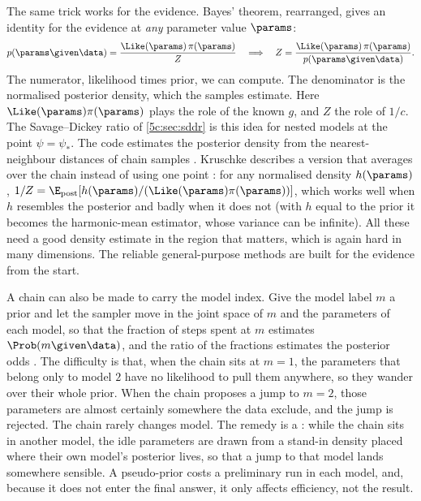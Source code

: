 The same trick works for the evidence. Bayes' theorem, rearranged, gives an identity
for the evidence at \emph{any} parameter value $\params$:
\begin{align}
  p(\params\given\data)=\frac{\Like(\params)\,\pi(\params)}{Z}
  \quad\Longrightarrow\quad
  Z=\frac{\Like(\params)\,\pi(\params)}{p(\params\given\data)} .
  \label{5c:eq:candidate}
\end{align}
The numerator, likelihood times prior, we can compute. The denominator is the
normalised posterior density, which the samples estimate. Here $\Like(\params)\pi(\params)$
plays the role of the known $g$, and $Z$ the role of $1/c$. The Savage--Dickey ratio of
\cref{5c:sec:sddr} is this idea for
nested models at the point $\psi=\psi_*$. The  code estimates the
posterior density from the nearest-neighbour distances of chain samples
. Kruschke describes a version that averages over the chain
instead of using one point : for any normalised density
$h(\params)$, $1/Z=\E_{\rm post}[h(\params)/(\Like(\params)\pi(\params))]$, which works
well when $h$ resembles the posterior and badly when it does not (with $h$ equal to the
prior it becomes the harmonic-mean estimator, whose variance can be infinite). All
these need a good density estimate in the region that matters, which is again hard in
many dimensions. The reliable general-purpose methods are built for the evidence from
the start.

A chain can also be made to carry the model index. Give the model label $m$ a prior and
let the sampler move in the joint space of $m$ and the parameters of each model, so that
the fraction of steps spent at $m$ estimates $\Prob(m\given\data)$, and the ratio of
the fractions estimates the posterior odds . The
difficulty is that, when the chain sits at $m=1$, the parameters that belong only to
model $2$ have no likelihood to pull them anywhere, so they wander over their whole
prior. When the chain proposes a jump to $m=2$, those parameters are almost certainly
somewhere the data exclude, and the jump is rejected. The chain rarely changes model.
The remedy is a : while the chain sits in another model, the
idle parameters are drawn from a stand-in density placed where their own model's posterior
lives, so that a jump to that model lands somewhere sensible. A pseudo-prior costs a
preliminary run in each model, and, because it does not enter the final answer, it
only affects efficiency, not the result.

